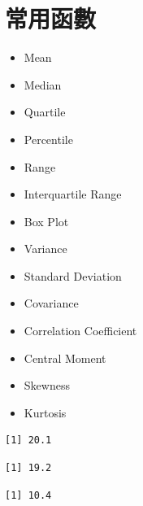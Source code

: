 \documentclass[]{book}
\newenvironment{Shaded}{\begin{snugshade}}{\end{snugshade}}
\newcommand{\KeywordTok}[1]{\textcolor[rgb]{0.13,0.29,0.53}{\textbf{#1}}}
\newcommand{\NormalTok}[1]{#1}
\newcommand{\OperatorTok}[1]{\textcolor[rgb]{0.81,0.36,0.00}{\textbf{#1}}}
\providecommand{\tightlist}{%
  \setlength{\itemsep}{0pt}\setlength{\parskip}{0pt}}
\theoremstyle{definition}
\theoremstyle{definition}
\theoremstyle{definition}
\theoremstyle{remark}
\begin{document}
\section{常用函數}

\begin{itemize}
\tightlist
\item
  Mean
\item
  Median
\item
  Quartile
\item
  Percentile
\item
  Range
\item
  Interquartile Range
\item
  Box Plot
\item
  Variance
\item
  Standard Deviation
\item
  Covariance
\item
  Correlation Coefficient
\item
  Central Moment
\item
  Skewness
\item
  Kurtosis
\end{itemize}

\begin{Shaded}
\end{Shaded}

\begin{verbatim}
[1] 20.1
\end{verbatim}

\begin{Shaded}
\end{Shaded}

\begin{verbatim}
[1] 19.2
\end{verbatim}

\begin{Shaded}
\end{Shaded}

\begin{verbatim}
[1] 10.4
\end{verbatim}
\end{document}
